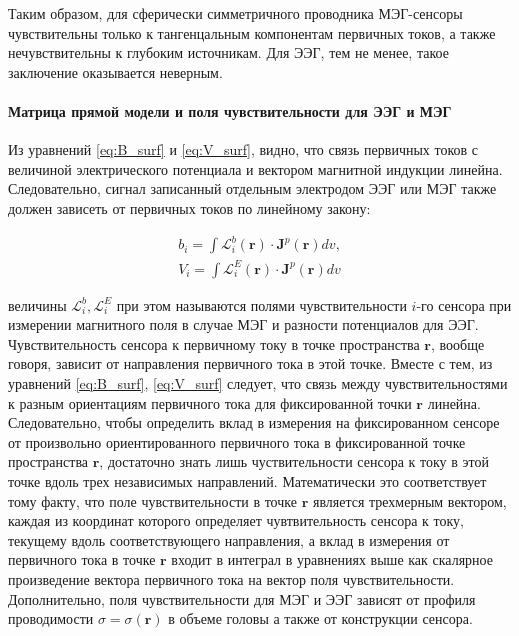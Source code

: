 Таким образом, для сферически симметричного проводника МЭГ-сенсоры чувствительны
только к тангенцальным компонентам первичных токов, а также нечувствительны к глубоким источникам.
Для ЭЭГ, тем не менее, такое заключение оказывается неверным.


\paragraph{Матрица прямой модели и поля чувствительности для ЭЭГ и МЭГ}
Из уравнений \ref{eq:B_surf} и \ref{eq:V_surf}, видно, что связь первичных токов с величиной электрического
потенциала и вектором магнитной индукции линейна. Следовательно, сигнал записанный отдельным
электродом ЭЭГ или МЭГ также должен зависеть от первичных токов по линейному закону:

\begin{gather}
    b_i = \int \mathbf{\mathcal{L}}_i^b(\mathbf{r}) \cdot \mathbf{J}^p(\mathbf{r})dv, \\
    V_i = \int \mathbf{\mathcal{L}}_i^E(\mathbf{r}) \cdot \mathbf{J}^p(\mathbf{r})dv
    \label{eq:lf_int}
\end{gather}

величины $\mathbf{\mathcal{L}}_i^b, \mathbf{\mathcal{L}}_i^E$
при этом называются полями чувствительности $i$-го сенсора при измерении магнитного поля
в случае МЭГ и разности потенциалов для ЭЭГ. Чувствительность сенсора к первичному току
в точке пространства $\mathbf{r}$, вообще говоря, зависит от направления первичного тока в этой точке.
Вместе с тем, из уравнений \ref{eq:B_surf}, \ref{eq:V_surf} следует, что связь между чувствительностями
к разным ориентациям первичного тока для фиксированной точки $\mathbf{r}$ линейна. Следовательно,
чтобы определить вклад в измерения на фиксированном сенсоре от произвольно ориентированного первичного тока
в фиксированной точке пространства $\mathbf{r}$,
достаточно знать лишь чуствительности сенсора к току в этой точке вдоль трех независимых направлений.
Математически это соответствует тому факту, что поле чувствительности в точке $\mathbf{r}$ является
трехмерным вектором, каждая из координат которого определяет чувтвительность сенсора к току, текущему
вдоль соответствующего направления, а вклад в измерения от первичного тока в точке $\mathbf{r}$
входит в интеграл в уравнениях выше как скалярное произведение вектора первичного тока на вектор
поля чувствительности.
Дополнительно, поля чувствительности для МЭГ и ЭЭГ зависят от профиля проводимости $\sigma=\sigma(\mathbf{r})$
в объеме головы а также от конструкции сенсора.

